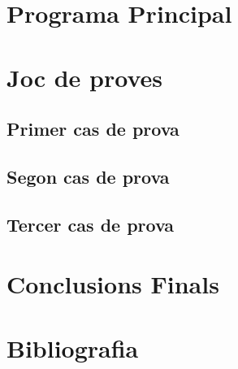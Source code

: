 \documentclass[conference]{IEEEtran}
\begin{document}
\section{Programa Principal}


\section{Joc de proves}

    \subsection{Primer cas de prova}


    \subsection{Segon cas de prova}

    \subsection{Tercer cas de prova}

\section{Conclusions Finals}




\section{Bibliografia}

    
\end{document}
